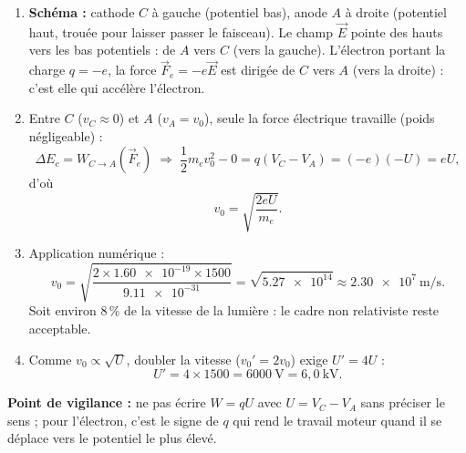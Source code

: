 \documentclass[11pt]{article}
\begin{document}
\begin{corrige}
\begin{enumerate}
\item \textbf{Schéma :} cathode $C$ à gauche (potentiel bas), anode $A$ à droite (potentiel haut, trouée pour laisser passer le faisceau). Le champ $\vec{E}$ pointe des hauts vers les bas potentiels : de $A$ vers $C$ (vers la gauche). L'électron portant la charge $q=-e$, la force $\vec{F}_e = -e\vec{E}$ est dirigée de $C$ vers $A$ (vers la droite) : c'est elle qui accélère l'électron.
\item Entre $C$ ($v_C \approx 0$) et $A$ ($v_A = v_0$), seule la force électrique travaille (poids négligeable) :
\[
\Delta E_c = W_{C\to A}(\vec{F}_e) \;\Longrightarrow\; \frac{1}{2}m_e v_0^2 - 0 = q(V_C - V_A) = (-e)(-U) = eU,
\]
d'où
\[
\boxed{v_0 = \sqrt{\frac{2eU}{m_e}}}.
\]
\item Application numérique :
\[
v_0 = \sqrt{\frac{2\times\num{1,60e-19}\times 1500}{\num{9,11e-31}}} = \sqrt{\num{5,27e14}} \approx \num{2,30e7}~\mathrm{m/s}.
\]
Soit environ $8\,\%$ de la vitesse de la lumière : le cadre non relativiste reste acceptable.
\item Comme $v_0 \propto \sqrt{U}$, doubler la vitesse ($v_0' = 2v_0$) exige $U' = 4U$ :
\[
U' = 4\times 1500 = 6000~\mathrm{V} = 6,0~\mathrm{kV}.
\]
\end{enumerate}
\textbf{Point de vigilance :} ne pas écrire $W = qU$ avec $U = V_C - V_A$ sans préciser le sens ; pour l'électron, c'est le signe de $q$ qui rend le travail moteur quand il se déplace vers le potentiel le plus élevé.
\end{corrige}
\end{document}
